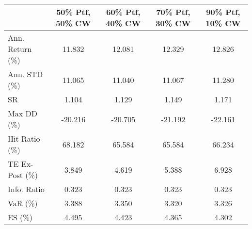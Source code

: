 \begin{tabular}{lcccc}
\toprule
{} &  50\% Ptf, 50\% CW &  60\% Ptf, 40\% CW &  70\% Ptf, 30\% CW &  90\% Ptf, 10\% CW \\
\midrule
Ann. Return (\%) &           11.832 &           12.081 &           12.329 &           12.826 \\
Ann. STD (\%)    &           11.065 &           11.040 &           11.067 &           11.280 \\
SR              &            1.104 &            1.129 &            1.149 &            1.171 \\
Max DD (\%)      &          -20.216 &          -20.705 &          -21.192 &          -22.161 \\
Hit Ratio (\%)   &           68.182 &           65.584 &           65.584 &           66.234 \\
TE Ex-Post (\%)  &            3.849 &            4.619 &            5.388 &            6.928 \\
Info. Ratio     &            0.323 &            0.323 &            0.323 &            0.323 \\
VaR (\%)         &            3.388 &            3.350 &            3.320 &            3.326 \\
ES (\%)          &            4.495 &            4.423 &            4.365 &            4.302 \\
\bottomrule
\end{tabular}
